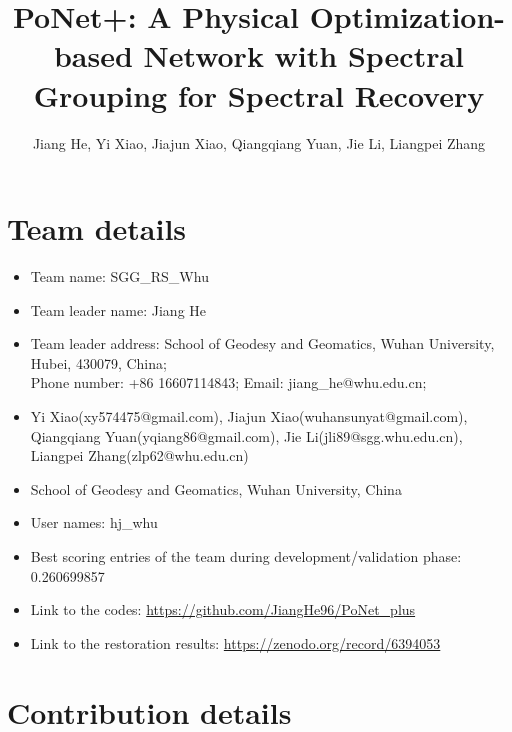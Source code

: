 \documentclass{article}
\title{PoNet+: A Physical Optimization-based Network with Spectral Grouping for Spectral Recovery}
\author{Jiang He, Yi Xiao, Jiajun Xiao, Qiangqiang Yuan, Jie Li, Liangpei Zhang}
\begin{document}
\maketitle

\section{Team details}

\begin{itemize}
\item Team name: SGG\_RS\_Whu                                  
\item Team leader name: Jiang He                           
\item Team leader address: School of Geodesy and Geomatics, Wuhan University, Hubei, 430079, China;  \\Phone number: +86 16607114843; Email: jiang\_he@whu.edu.cn; 
\item Yi Xiao(xy574475@gmail.com), Jiajun Xiao(wuhansunyat@gmail.com),\\Qiangqiang Yuan(yqiang86@gmail.com), Jie Li(jli89@sgg.whu.edu.cn), \\Liangpei Zhang(zlp62@whu.edu.cn)
\item School of Geodesy and Geomatics, Wuhan University, China
\item User names: hj\_whu 
\item Best scoring entries of the team during development/validation phase: 0.260699857
\item Link to the codes: \href{https://github.com/JiangHe96/PoNet_plus}{https://github.com/JiangHe96/PoNet\_plus}
\item Link to the restoration results: \href{https://zenodo.org/record/6394053}{https://zenodo.org/record/6394053}
\end{itemize}

\section{Contribution details}
\end{document}
